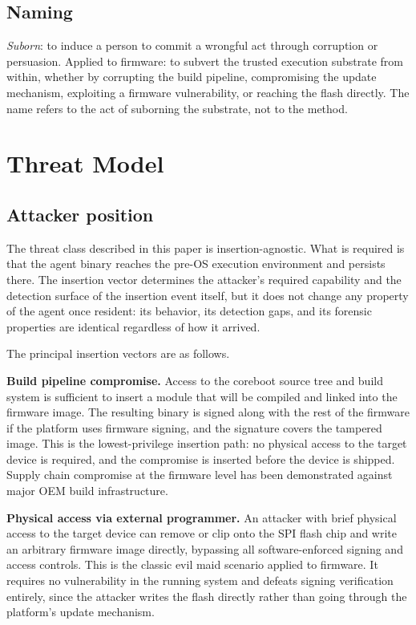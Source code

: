 \documentclass[11pt,a4paper]{article}
\begin{document}
\subsection{Naming}

\textit{Suborn}: to induce a person to commit a wrongful act through corruption or persuasion. Applied to firmware: to subvert the trusted execution substrate from within, whether by corrupting the build pipeline, compromising the update mechanism, exploiting a firmware vulnerability, or reaching the flash directly. The name refers to the act of suborning the substrate, not to the method.

\section{Threat Model}

\subsection{Attacker position}

The threat class described in this paper is insertion-agnostic. What is required is that the agent binary reaches the pre-OS execution environment and persists there. The insertion vector determines the attacker's required capability and the detection surface of the insertion event itself, but it does not change any property of the agent once resident: its behavior, its detection gaps, and its forensic properties are identical regardless of how it arrived.

The principal insertion vectors are as follows.

\textbf{Build pipeline compromise.} Access to the coreboot source tree and build system is sufficient to insert a module that will be compiled and linked into the firmware image. The resulting binary is signed along with the rest of the firmware if the platform uses firmware signing, and the signature covers the tampered image. This is the lowest-privilege insertion path: no physical access to the target device is required, and the compromise is inserted before the device is shipped. Supply chain compromise at the firmware level has been demonstrated against major OEM build infrastructure.

\textbf{Physical access via external programmer.} An attacker with brief physical access to the target device can remove or clip onto the SPI flash chip and write an arbitrary firmware image directly, bypassing all software-enforced signing and access controls. This is the classic evil maid scenario applied to firmware. It requires no vulnerability in the running system and defeats signing verification entirely, since the attacker writes the flash directly rather than going through the platform's update mechanism.
\end{document}
